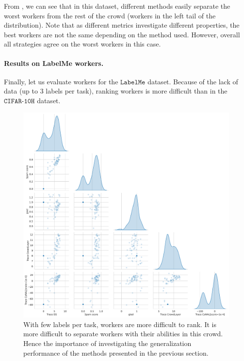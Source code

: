 From , we can see that in this dataset, different methods easily separate the worst workers from the rest of the crowd (workers in the left tail of the distribution).
Note that as different metrics investigate different properties, the best workers are not the same depending on the method used.
However, overall all strategies agree on the worst workers in this case.

\paragraph{Results on LabelMe workers.}
Finally, let us evaluate workers for the $\texttt{LabelMe}$ dataset.
Because of the lack of data (up to 3 labels per task), ranking workers is more difficult than in the $\texttt{CIFAR-10H}$ dataset.

\begin{figure}[tbh]
    \centering
    \includegraphics[width=.95\textwidth]{./images_peerannot/fig-abilities-labelme-output-1.pdf}
    \caption{With few labels per task, workers are more difficult to rank. It is more difficult to separate workers with their abilities in this crowd. Hence the importance of investigating the generalization performance of the methods presented in the previous section.}
    \label{fig:abilitieslabelme}
\end{figure}

